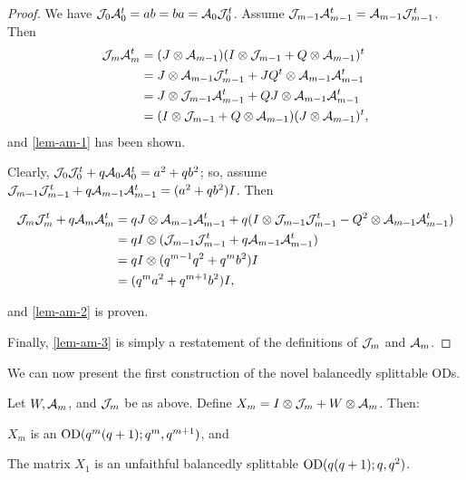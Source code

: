 \documentclass[../../../main]{subfiles}
\begin{document}
\begin{proof}
 We have $\mathcal{J}_0\mathcal{A}_0^t=ab=ba=\mathcal{A}_0\mathcal{J}_0^t$. Assume $\mathcal{J}_{m-1}\mathcal{A}_{m-1}^t=\mathcal{A}_{m-1}\mathcal{J}_{m-1}^t$. Then
 \begin{align*}
  \mathcal{J}_m\mathcal{A}_m^t &= (J \otimes \mathcal{A}_{m-1})(I \otimes \mathcal{J}_{m-1} + Q \otimes \mathcal{A}_{m-1})^t \\
  &= J \otimes \mathcal{A}_{m-1}\mathcal{J}_{m-1}^t + JQ^t \otimes \mathcal{A}_{m-1}\mathcal{A}_{m-1}^t \\
  &= J \otimes \mathcal{J}_{m-1}\mathcal{A}_{m-1}^t + QJ \otimes \mathcal{A}_{m-1}\mathcal{A}_{m-1}^t \\
  &= (I \otimes \mathcal{J}_{m-1} + Q \otimes \mathcal{A}_{m-1})(J \otimes \mathcal{A}_{m-1})^t,
 \end{align*}
 and \ref{lem-am-1} has been shown.
 
 Clearly, $\mathcal{J}_0\mathcal{J}_0^t + q\mathcal{A}_0\mathcal{A}_0^t = a^2+qb^2$; so, assume $\mathcal{J}_{m-1}\mathcal{J}_{m-1}^t + q\mathcal{A}_{m-1}\mathcal{A}_{m-1}^t = (a^2+qb^2)I$. Then
 \begin{small}
 \begin{align*}
  \mathcal{J}_m\mathcal{J}_m^t + q\mathcal{A}_m\mathcal{A}_m^t &= qJ \otimes \mathcal{A}_{m-1}\mathcal{A}_{m-1}^t + q(I \otimes \mathcal{J}_{m-1}\mathcal{J}_{m-1}^t - Q^2 \otimes \mathcal{A}_{m-1}\mathcal{A}_{m-1}^t) \\
  &= qI \otimes (\mathcal{J}_{m-1}\mathcal{J}_{m-1}^t + q\mathcal{A}_{m-1}\mathcal{A}_{m-1}^t) \\
  &= qI \otimes (q^{m-1}q^2 + q^mb^2)I \\
  &= (q^ma^2 + q^{m+1}b^2)I,
 \end{align*}
 \end{small}
 and \ref{lem-am-2} is proven.
 
 Finally, \ref{lem-am-3} is simply a restatement of the definitions of $\mathcal{J}_m$ and $\mathcal{A}_m$.
\end{proof}

We can now present the first construction of the novel balancedly splittable ODs.

\begin{thm}
 Let $W, \mathcal{A}_m$, and $\mathcal{J}_m$ be as above. Define $X_m = I \otimes \mathcal{J}_m + W \otimes \mathcal{A}_m$. Then:
 \begin{defenum}
  \item $X_m$ is an $\text{OD}(q^m(q+1); q^m, q^{m+1})$, and
  \item The matrix $X_1$ is an unfaithful balancedly splittable $\text{OD}(q(q+1); q, q^2)$.
 \end{defenum}
\end{thm}
\end{document}
